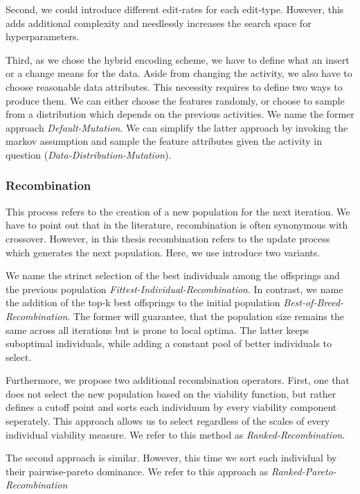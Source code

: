 \documentclass[./../../paper.tex]{subfiles}
\begin{document}
Second, we could introduce different edit-rates for each edit-type. However, this adds additional complexity and needlessly increases the search space for hyperparameters.

Third, as we chose the hybrid encoding scheme, we have to define what an insert or a change means for the data. Aside from changing the activity, we also have to choose reasonable data attributes. This necessity requires to define two ways to produce them. We can either choose the features randomly, or choose to sample from a distribution which depends on the previous activities. We name the former approach \emph{Default-Mutation}. We can simplify the latter approach by invoking the markov assumption and sample the feature attributes given the activity in question (\emph{Data-Distribution-Mutation}).

\subsubsection{Recombination}
This process refers to the creation of a new population for the next iteration. We have to point out that in the literature, recombination is often synonymous with crossover. However, in this thesis recombination refers to the update process which generates the next population. Here, we use introduce two variants.

We name the strinct selection of the best individuals among the offsprings and the previous population \emph{Fittest-Individual-Recombination}. In contrast, we name the addition of the top-k best offsprings to the initial population \emph{Best-of-Breed-Recombination}. The former will guarantee, that the population size remains the same across all iterations but is prone to local optima. The latter keeps suboptimal individuals, while adding a constant pool of better individuals to select. 

Furthermore, we propose two additional recombination operators. First, one that does not select the new population based on the viability function, but rather defines a cutoff point and sorts each individuum by every viability component seperately. This approach allows us to select regardless of the scales of every individual viability measure. We refer to this method as \emph{Ranked-Recombination}. 

The second approach is similar. However, this time we sort each individual by their pairwise-pareto dominance. We refer to this approach as \emph{Ranked-Pareto-Recombination} 
\end{document}

